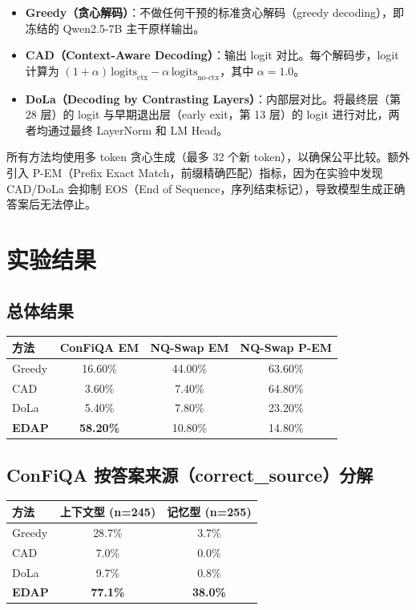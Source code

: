 \documentclass[11pt,a4paper]{ctexart}
\begin{document}
\begin{itemize}
    \item \textbf{Greedy（贪心解码）}：不做任何干预的标准贪心解码（greedy decoding），即冻结的 Qwen2.5-7B 主干原样输出。
    \item \textbf{CAD（Context-Aware Decoding）}：输出 logit 对比。每个解码步，logit 计算为 $(1+\alpha)\,\text{logits}_{\text{ctx}} - \alpha\,\text{logits}_{\text{no-ctx}}$，其中 $\alpha = 1.0$。
    \item \textbf{DoLa（Decoding by Contrasting Layers）}：内部层对比。将最终层（第 28 层）的 logit 与早期退出层（early exit，第 13 层）的 logit 进行对比，两者均通过最终 LayerNorm 和 LM Head。
\end{itemize}

所有方法均使用多 token 贪心生成（最多 32 个新 token），以确保公平比较。额外引入 P-EM（Prefix Exact Match，前缀精确匹配）指标，因为在实验中发现 CAD/DoLa 会抑制 EOS（End of Sequence，序列结束标记），导致模型生成正确答案后无法停止。

\section{实验结果}

\subsection{总体结果}

\begin{table}[h]
\centering
\begin{tabular}{lccc}
\toprule
方法 & ConFiQA EM & NQ-Swap EM & NQ-Swap P-EM \\
\midrule
Greedy & 16.60\% & 44.00\% & 63.60\% \\
CAD   & 3.60\%  & 7.40\%  & 64.80\% \\
DoLa  & 5.40\%  & 7.80\%  & 23.20\% \\
\textbf{EDAP} & \textbf{58.20\%} & 10.80\% & 14.80\% \\
\bottomrule
\end{tabular}
\end{table}

\subsection{ConFiQA 按答案来源（correct\_source）分解}

\begin{table}[h]
\centering
\begin{tabular}{lcc}
\toprule
方法 & 上下文型 (n=245) & 记忆型 (n=255) \\
\midrule
Greedy & 28.7\% & 3.7\% \\
CAD   & 7.0\%  & 0.0\% \\
DoLa  & 9.7\%  & 0.8\% \\
\textbf{EDAP} & \textbf{77.1\%} & \textbf{38.0\%} \\
\bottomrule
\end{tabular}
\end{table}
\end{document}
